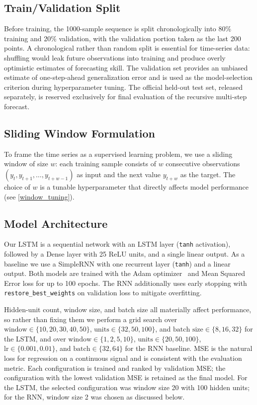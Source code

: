 \documentclass[conference]{IEEEtran}
\begin{document}
\subsection{Train/Validation Split}
Before training, the 1000-sample sequence is split chronologically into 80\% training and 20\% validation, with the validation portion taken as the last 200 points. A chronological rather than random split is essential for time-series data: shuffling would leak future observations into training and produce overly optimistic estimates of forecasting skill. The validation set provides an unbiased estimate of one-step-ahead generalization error and is used as the model-selection criterion during hyperparameter tuning. The official held-out test set, released separately, is reserved exclusively for final evaluation of the recursive multi-step forecast.

\subsection{Sliding Window Formulation}
To frame the time series as a supervised learning problem, we use a sliding window of size $w$: each training sample consists of $w$ consecutive observations $(y_t, y_{t+1}, \ldots, y_{t+w-1})$ as input and the next value $y_{t+w}$ as the target. The choice of $w$ is a tunable hyperparameter that directly affects model performance (see \cref{window_tuning}).

\subsection{Model Architecture}
Our LSTM is a sequential network with an LSTM layer (\texttt{tanh} activation), followed by a Dense layer with 25 ReLU units, and a single linear output. As a baseline we use a SimpleRNN with one recurrent layer (\texttt{tanh}) and a linear output. Both models are trained with the Adam optimizer~\cite{b8} and Mean Squared Error loss for up to 100 epochs. The RNN additionally uses early stopping with \texttt{restore\_best\_weights} on validation loss to mitigate overfitting.

Hidden-unit count, window size, and batch size all materially affect performance, so rather than fixing them we perform a grid search over $\text{window} \in \{10, 20, 30, 40, 50\}$, $\text{units} \in \{32, 50, 100\}$, and $\text{batch size} \in \{8, 16, 32\}$ for the LSTM, and over $\text{window} \in \{1, 2, 5, 10\}$, $\text{units} \in \{20, 50, 100\}$, $\text{lr} \in \{0.001, 0.01\}$, and $\text{batch} \in \{32, 64\}$ for the RNN baseline. MSE is the natural loss for regression on a continuous signal and is consistent with the evaluation metric. Each configuration is trained and ranked by validation MSE; the configuration with the lowest validation MSE is retained as the final model. For the LSTM, the selected configuration was window size 20 with 100 hidden units; for the RNN, window size 2 was chosen as discussed below.
\end{document}
